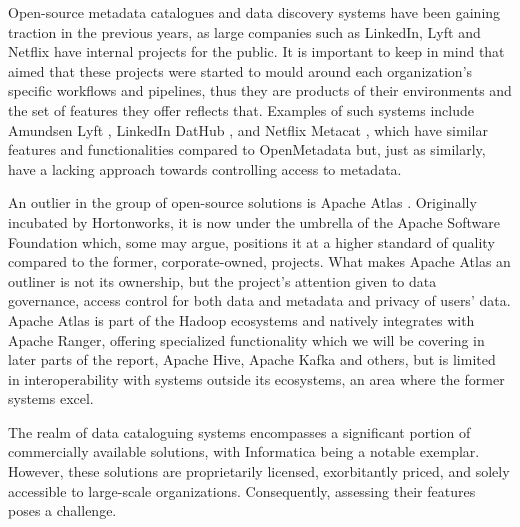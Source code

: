 Open-source metadata catalogues and data discovery systems have been gaining traction in the previous years, as large companies such as LinkedIn, Lyft and Netflix have internal projects for the public. It is important to keep in mind that aimed that these projects were started to mould around each organization's specific workflows and pipelines, thus they are products of their environments and the set of features they offer reflects that. Examples of such systems include Amundsen Lyft \cite{amundsenLyftGrover2019}, LinkedIn DatHub \cite{dataHubLinkedinLan2019}, and Netflix Metacat \cite{metacatNetflixMajumdar2018}, which have similar features and functionalities compared to OpenMetadata but, just as similarly, have a lacking approach towards controlling access to metadata.

An outlier in the group of open-source solutions is Apache Atlas \cite{apacheAtlasTech}. Originally incubated by Hortonworks, it is now under the umbrella of the Apache Software Foundation which, some may argue, positions it at a higher standard of quality compared to the former, corporate-owned, projects. What makes Apache Atlas an outliner is not its ownership, but the project's attention given to data governance, access control for both data and metadata and privacy of users' data. Apache Atlas is part of the Hadoop ecosystems and natively integrates with Apache Ranger, offering specialized functionality which we will be covering in later parts of the report, Apache Hive, Apache Kafka and others, but is limited in interoperability with systems outside its ecosystems, an area where the former systems excel.

The realm of data cataloguing systems encompasses a significant portion of commercially available solutions, with Informatica \cite{informaticaTech} being a notable exemplar. However, these solutions are proprietarily licensed, exorbitantly priced, and solely accessible to large-scale organizations. Consequently, assessing their features poses a challenge.
